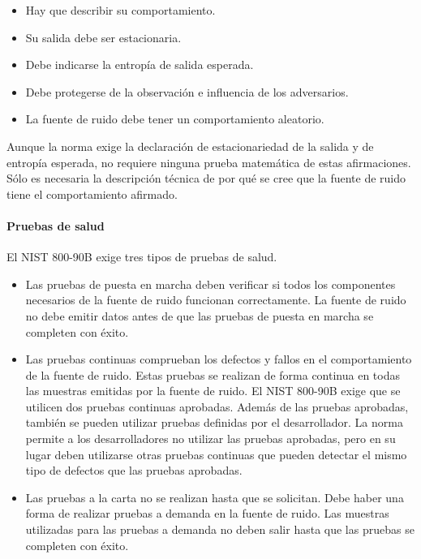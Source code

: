		\begin{itemize}[noitemsep]
			\item Hay que describir su comportamiento.
			\item Su salida debe ser estacionaria.
			\item Debe indicarse la entropía de salida esperada.
			\item Debe protegerse de la observación e influencia de los adversarios.
			\item La fuente de ruido debe tener un comportamiento aleatorio.
		\end{itemize}
		
		Aunque la norma exige la declaración de estacionariedad de la salida y de entropía esperada, no requiere ninguna prueba matemática de estas afirmaciones. Sólo es necesaria la descripción técnica de por qué se cree que la fuente de ruido tiene el comportamiento afirmado.
		
		
		\paragraph{Pruebas de salud\\}
		
		El NIST 800-90B exige tres tipos de pruebas de salud.
		
		\begin{itemize}[noitemsep]
			\item Las pruebas de puesta en marcha deben verificar si todos los componentes necesarios de la fuente de ruido funcionan correctamente. La fuente de ruido no debe emitir datos antes de que las pruebas de puesta en marcha se completen con éxito.
			\item Las pruebas continuas comprueban los defectos y fallos en el comportamiento de la fuente de ruido. Estas pruebas se realizan de forma continua en todas las muestras emitidas por la fuente de ruido. El NIST 800-90B exige que se utilicen dos pruebas continuas aprobadas. Además de las pruebas aprobadas, también se pueden utilizar pruebas definidas por el desarrollador. La norma permite a los desarrolladores no utilizar las pruebas aprobadas, pero en su lugar deben utilizarse otras pruebas continuas que pueden detectar el mismo tipo de defectos que las pruebas aprobadas.
			\item Las pruebas a la carta no se realizan hasta que se solicitan. Debe haber una forma de realizar pruebas a demanda en la fuente de ruido. Las muestras utilizadas para las pruebas a demanda no deben salir hasta que las pruebas se completen con éxito.
		\end{itemize}
		
